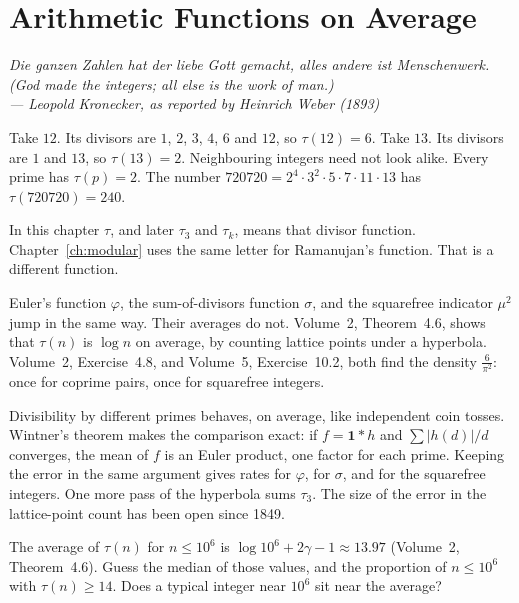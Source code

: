 \chapter{Arithmetic Functions on Average}\label{ch:averages}

\begin{center}\itshape
Die ganzen Zahlen hat der liebe Gott gemacht, alles andere ist Menschenwerk.\\
(God made the integers; all else is the work of man.)\\
\upshape --- Leopold Kronecker, as reported by Heinrich Weber (1893)
\end{center}

Take $12$. Its divisors are $1$, $2$, $3$, $4$, $6$ and $12$, so $\tau(12)=6$. Take $13$. Its divisors are $1$ and $13$, so $\tau(13)=2$. Neighbouring integers need not look alike. Every prime has $\tau(p)=2$. The number $720720=2^4\cdot3^2\cdot5\cdot7\cdot11\cdot13$ has $\tau(720720)=240$.

In this chapter $\tau$, and later $\tau_3$ and $\tau_k$, means that divisor function. Chapter~\ref{ch:modular} uses the same letter for Ramanujan's function. That is a different function.

Euler's function $\varphi$, the sum-of-divisors function $\sigma$, and the squarefree indicator $\mu^2$ jump in the same way. Their averages do not. Volume~2, Theorem~4.6, shows that $\tau(n)$ is $\log n$ on average, by counting lattice points under a hyperbola. Volume~2, Exercise~4.8, and Volume~5, Exercise~10.2, both find the density $\frac6{\pi^2}$: once for coprime pairs, once for squarefree integers.

Divisibility by different primes behaves, on average, like independent coin tosses. Wintner's theorem makes the comparison exact: if $f=\mathbf1*h$ and $\sum|h(d)|/d$ converges, the mean of $f$ is an Euler product, one factor for each prime. Keeping the error in the same argument gives rates for $\varphi$, for $\sigma$, and for the squarefree integers. One more pass of the hyperbola sums $\tau_3$. The size of the error in the lattice-point count has been open since 1849.

\begin{think}
The average of $\tau(n)$ for $n\le10^6$ is $\log10^6+2\gamma-1\approx13.97$ (Volume~2, Theorem~4.6). Guess the median of those values, and the proportion of $n\le10^6$ with $\tau(n)\ge14$. Does a typical integer near $10^6$ sit near the average?
\end{think}

